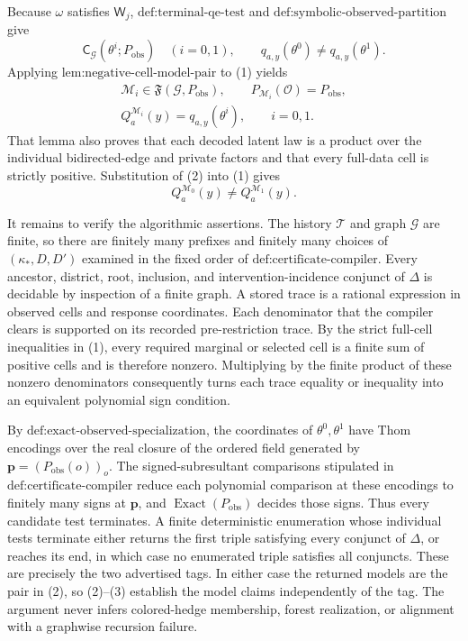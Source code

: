 Because \(\omega\) satisfies \(\mathsf W_j\), \(\text{def:terminal-qe-test}\) and \(\text{def:symbolic-observed-partition}\) give
\[
\mathsf C_{\mathcal G}(\theta^i;P_{\mathrm{obs}})
\quad(i=0,1),
\qquad
q_{a,y}(\theta^0)\neq q_{a,y}(\theta^1).
\tag{1}
\]
Applying \(\text{lem:negative-cell-model-pair}\) to (1) yields
\[
\begin{gathered}
\mathcal M_i\in\mathfrak F(\mathcal G,P_{\mathrm{obs}}),
\qquad
P_{\mathcal M_i}(\mathcal O)=P_{\mathrm{obs}},\\
Q_a^{\mathcal M_i}(y)=q_{a,y}(\theta^i),
\qquad i=0,1.
\end{gathered}
\tag{2}
\]
That lemma also proves that each decoded latent law is a product over the individual bidirected-edge and private factors and that every full-data cell is strictly positive.  Substitution of (2) into (1) gives
\[
Q_a^{\mathcal M_0}(y)\neq Q_a^{\mathcal M_1}(y).
\tag{3}
\]

It remains to verify the algorithmic assertions.  The history \(\mathcal T\) and graph \(\mathcal G\) are finite, so there are finitely many prefixes and finitely many choices of \((\kappa_*,D,D')\) examined in the fixed order of \(\text{def:certificate-compiler}\).  Every ancestor, district, root, inclusion, and intervention-incidence conjunct of \(\Delta\) is decidable by inspection of a finite graph.  A stored trace is a rational expression in observed cells and response coordinates.  Each denominator that the compiler clears is supported on its recorded pre-restriction trace.  By the strict full-cell inequalities in (1), every required marginal or selected cell is a finite sum of positive cells and is therefore nonzero.  Multiplying by the finite product of these nonzero denominators consequently turns each trace equality or inequality into an equivalent polynomial sign condition.

By \(\text{def:exact-observed-specialization}\), the coordinates of \(\theta^0,\theta^1\) have Thom encodings over the real closure of the ordered field generated by \(\mathbf p=(P_{\mathrm{obs}}(o))_o\).  The signed-subresultant comparisons stipulated in \(\text{def:certificate-compiler}\) reduce each polynomial comparison at these encodings to finitely many signs at \(\mathbf p\), and \(\operatorname{Exact}(P_{\mathrm{obs}})\) decides those signs.  Thus every candidate test terminates.  A finite deterministic enumeration whose individual tests terminate either returns the first triple satisfying every conjunct of \(\Delta\), or reaches its end, in which case no enumerated triple satisfies all conjuncts.  These are precisely the two advertised tags.  In either case the returned models are the pair in (2), so (2)--(3) establish the model claims independently of the tag.  The argument never infers colored-hedge membership, forest realization, or alignment with a graphwise recursion failure.